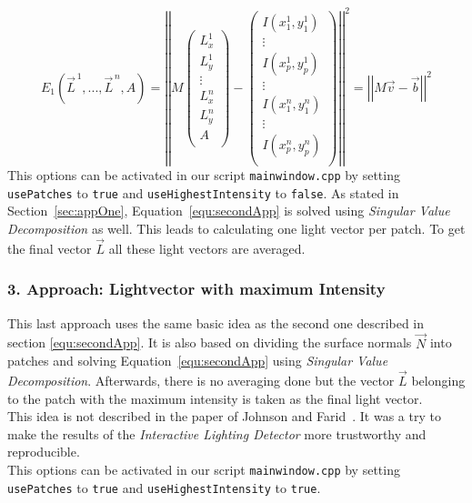 \begin{equation}
\label{equ:secondApp}
E_{1}(\vec{L}^{\,1} , ... , \vec{L}^{\,n} , A) = 
\left\vert \left\vert 
M
\begin{pmatrix}
L^{1}_{x} \\
L^{1}_{y} \\
\vdots  \\
L^{n}_{x} \\
L^{n}_{y} \\
A \\
\end{pmatrix} -
\begin{pmatrix}
I(x^{1}_{1} , y^{1}_{1}) \\
\vdots  \\
I(x^{1}_{p} , y^{1}_{p}) \\
\vdots  \\
I(x^{n}_{1} , y^{n}_{1}) \\
\vdots  \\
I(x^{n}_{p} , y^{n}_{p}) \\
\end{pmatrix}
 \right\vert\right\vert^{2}
 = \left\vert \left\vert  M\vec{v}-\vec{b}  \right\vert\right\vert^{2}
\end{equation}
This options can be activated in our script \texttt{mainwindow.cpp} by setting \texttt{usePatches} to \texttt{true} and \texttt{useHighestIntensity} to \texttt{false}.
As stated in Section~\ref{sec:appOne}, Equation~\ref{equ:secondApp} is solved using \textit{Singular Value Decomposition} as well. This leads to calculating one light vector per patch. To get the final vector $\vec{L}$ all these light vectors are averaged.


\subsubsection{3. Approach: Lightvector with maximum Intensity}\label{sec:appThree}

This last approach uses the same basic idea as the second one described in section \ref{equ:secondApp}. It is also based on dividing the surface normals $\vec{N}$ into patches and solving Equation~\ref{equ:secondApp} using \textit{Singular Value Decomposition}. Afterwards, there is no averaging done but the vector $\vec{L}$ belonging to the patch with the maximum intensity is taken as the final light vector. \\
This idea is not described in the paper of Johnson and Farid~\cite{Johnson}. It was a try to make the results of the \textit{Interactive Lighting Detector} more trustworthy and reproducible. \\
This options can be activated in our script \texttt{mainwindow.cpp} by setting \texttt{usePatches} to \texttt{true} and \texttt{useHighestIntensity} to \texttt{true}.


